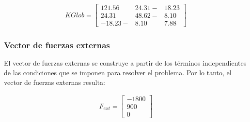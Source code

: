 \begin{eqnarray}
	KGlob = \left[
	\begin{array}{lll}
	121.56 & 24.31  -&18.23 \\
	24.31 & 48.62  -&8.10 \\
	-18.23  -&8.10 &7.88	
	\end{array}
	\right]
\end{eqnarray}

\subsubsection{Vector de fuerzas externas}

El vector de fuerzas externas se construye a partir de los términos independientes de las condiciones que se imponen para resolver el problema. Por lo tanto, el vector de fuerzas externas resulta:

\begin{eqnarray}
F_{ext} = \left[
\begin{array}{l}
-1800 \\
900 \\
0
\end{array}
\right]
\end{eqnarray}

